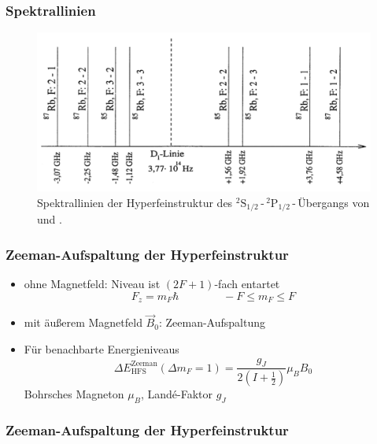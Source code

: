 \begin{frame}
\frametitle{Spektrallinien}
\begin{figure}
    \centering
    \includegraphics[width=\textwidth]{../img/HFSspect_theo.png}
    \caption{Spektrallinien der Hyperfeinstruktur des ${}^2\text{S}_{1/2}$\,-\,${}^2\text{P}_{1/2}$\,-\,Übergangs
    von  und .}  %
\end{figure}
\end{frame}

\begin{frame}
\frametitle{Zeeman-Aufspaltung der Hyperfeinstruktur}
\begin{itemize}
    \item<1-> ohne Magnetfeld: Niveau ist $(2F+1)$-fach entartet
    \begin{equation*}
        F_z = m_F \hbar \qquad \qquad -F \leq m_F \leq F
    \end{equation*}
    \item<2-> mit äußerem Magnetfeld $\vec{B}_0$: Zeeman-Aufspaltung
    \item<3-> Für benachbarte Energieniveaus
    \begin{equation*}
        \Delta E_\text{HFS}^\text{Zeeman}(\Delta m_F = 1) = \frac{g_J}{2 \left( I + \frac{1}{2} \right) } \mu_B B_0
    \end{equation*}
    Bohrsches Magneton $\mu_B$, Landé-Faktor $g_J$
\end{itemize}
\end{frame}

\begin{frame}
\frametitle{Zeeman-Aufspaltung der Hyperfeinstruktur}

  \begin{figure}
    \centering
    \def\svgwidth{0.45\textwidth}
    
    \label{img:termschema}
\end{figure}
\end{frame}




